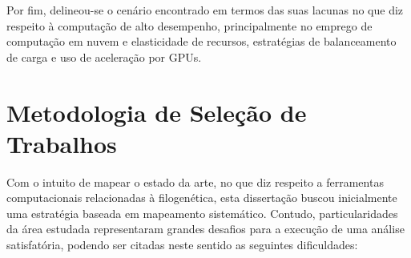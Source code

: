 \documentclass[english,brazilian]{UNISINOSmonografia} %
\begin{document}
Por fim, delineou-se o cenário encontrado em termos das suas lacunas no que diz respeito à computação de alto desempenho, principalmente no emprego de computação em nuvem e elasticidade de recursos, estratégias de balanceamento de carga e uso de aceleração por GPUs.


\section{Metodologia de Seleção de Trabalhos}


Com o intuito de mapear o estado da arte, no que diz respeito a ferramentas computacionais relacionadas à filogenética, esta dissertação buscou inicialmente uma estratégia baseada em mapeamento sistemático. Contudo, particularidades da área estudada representaram grandes desafios para a execução de uma análise satisfatória, podendo ser citadas neste sentido as seguintes dificuldades:
\end{document}
